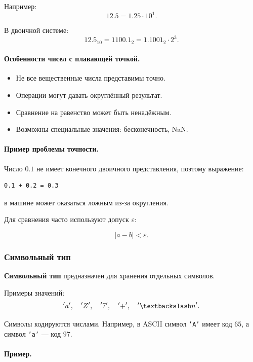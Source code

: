 \documentclass[12pt,a4paper]{article}
\begin{document}
Например:
\[
    12.5 = 1.25 \cdot 10^1.
\]

В двоичной системе:
\[
    12.5_{10} = 1100.1_2 = 1.1001_2 \cdot 2^3.
\]

\paragraph{Особенности чисел с плавающей точкой.}

\begin{itemize}
    \item Не все вещественные числа представимы точно.
    \item Операции могут давать округлённый результат.
    \item Сравнение на равенство может быть ненадёжным.
    \item Возможны специальные значения: бесконечность, NaN.
\end{itemize}

\paragraph{Пример проблемы точности.}

Число $0.1$ не имеет конечного двоичного представления, поэтому выражение:

\begin{verbatim}
0.1 + 0.2 = 0.3
\end{verbatim}

в машине может оказаться ложным из-за округления.

Для сравнения часто используют допуск $\varepsilon$:

\[
    |a - b| < \varepsilon.
\]

\subsubsection{Символьный тип}

\textbf{Символьный тип} предназначен для хранения отдельных символов.

Примеры значений:
\[
    'a', \quad 'Z', \quad '7', \quad '+', \quad '\textbackslash n'.
\]

Символы кодируются числами. Например, в ASCII символ \texttt{'A'} имеет код $65$, а символ \texttt{'a'} --- код $97$.

\paragraph{Пример.}
\end{document}
